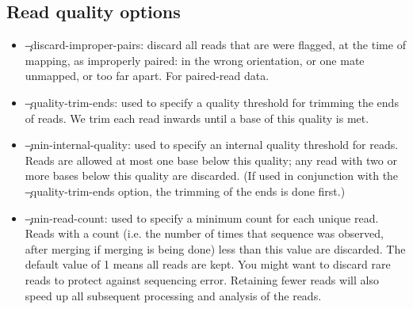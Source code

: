 \subsection{Read quality options}
\begin{itemize}
\item \c{--discard-improper-pairs}: discard all reads that are were flagged, at the time of mapping, as improperly paired: in the wrong orientation, or one mate unmapped, or too far apart.
For paired-read data.
\item \c{--quality-trim-ends}: used to specify a quality threshold for trimming the ends of reads.
We trim each read inwards until a base of this quality is met.
\item \c{--min-internal-quality}: used to specify an internal quality threshold for reads.
Reads are allowed at most one base below this quality; any read with two or more bases below this quality are discarded.
(If used in conjunction with the \c{--quality-trim-ends option}, the trimming of the ends is done first.)
\item \c{--min-read-count}: used to specify a minimum count for each unique read.
Reads with a count (i.e. the number of times that sequence was observed, after merging if merging is being done) less than this value are discarded.
The default value of 1 means all reads are kept.
You might want to discard rare reads to protect against sequencing error.
Retaining fewer reads will also speed up all subsequent processing and analysis of the reads.
\end{itemize}

